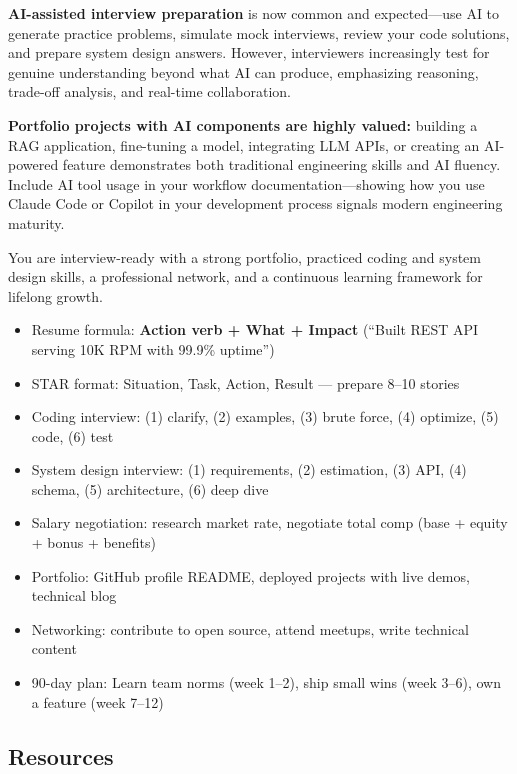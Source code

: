 \documentclass[11pt, a4paper, oneside]{report}
\begin{document}
\textbf{AI-assisted interview preparation} is now common and expected---use AI to generate practice problems, simulate mock interviews, review your code solutions, and prepare system design answers. However, interviewers increasingly test for genuine understanding beyond what AI can produce, emphasizing reasoning, trade-off analysis, and real-time collaboration.

\textbf{Portfolio projects with AI components are highly valued:} building a RAG application, fine-tuning a model, integrating LLM APIs, or creating an AI-powered feature demonstrates both traditional engineering skills and AI fluency. Include AI tool usage in your workflow documentation---showing how you use Claude Code or Copilot in your development process signals modern engineering maturity.

\begin{microcheckpoint}
You are interview-ready with a strong portfolio, practiced coding and system design skills, a professional network, and a continuous learning framework for lifelong growth.
\end{microcheckpoint}

\begin{cheatsheetbox}
\begin{itemize}[leftmargin=*]
\item Resume formula: \textbf{Action verb + What + Impact} (``Built REST API serving 10K RPM with 99.9\% uptime'')
\item STAR format: Situation, Task, Action, Result --- prepare 8--10 stories
\item Coding interview: (1) clarify, (2) examples, (3) brute force, (4) optimize, (5) code, (6) test
\item System design interview: (1) requirements, (2) estimation, (3) API, (4) schema, (5) architecture, (6) deep dive
\item Salary negotiation: research market rate, negotiate total comp (base + equity + bonus + benefits)
\item Portfolio: GitHub profile README, deployed projects with live demos, technical blog
\item Networking: contribute to open source, attend meetups, write technical content
\item 90-day plan: Learn team norms (week 1--2), ship small wins (week 3--6), own a feature (week 7--12)
\end{itemize}
\end{cheatsheetbox}

\subsection*{Resources}
\end{document}
